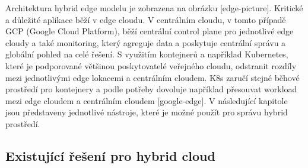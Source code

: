 	Architektura hybrid edge modelu je zobrazena na obrázku [edge-picture]. Kritické a důležité aplikace běží v edge cloudu. V centrálním cloudu, v tomto případě GCP (Google Cloud Platform), běží centrální control plane pro jednotlivé edge cloudy a také monitoring, který agreguje data a poskytuje centrální správu a globální pohled na celé řešení. S využitím kontejnerů a například Kubernetes, které je podporované většinou poskytovatelé veřejného cloudu, odstranit rozdíly mezi jednotlivými edge lokacemi a centrálním cloudem. K8s zaručí stejné běhové prostředí pro kontejnery a podle potřeby dovoluje například přesouvat workload mezi edge cloudem a centrálním cloudem [google-edge]. V následující kapitole jsou představeny jednotlivé nástroje, které je možné použít pro správu hybrid prostředí.

\subsection{Existující řešení pro hybrid cloud}

